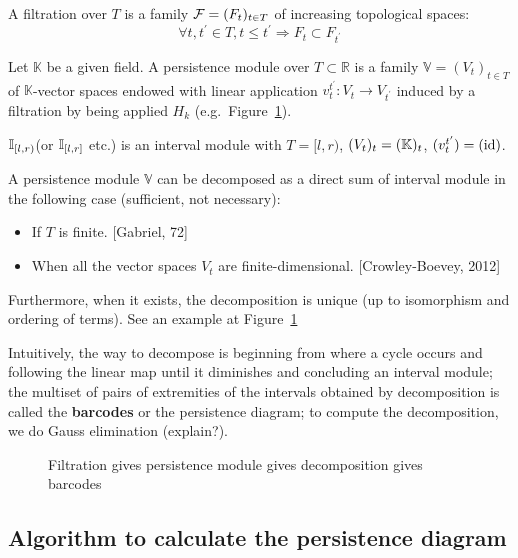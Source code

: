 \begin{definition}[Filtration]
  A filtration over $T$ is a family $\mathcal{F} = (F_t)_{t\in T}$ of increasing topological spaces:
  $$
  \forall t, t^{\prime} \in T, t \leqslant t^{\prime} \Rightarrow F_t \subset F_{t^{\prime}}
  $$
\end{definition}

\begin{definition}
  Let $\mathbb{K}$ be a given field. A persistence module over $T \subset \mathbb{R}$ is a family $\mathbb{V}=\left(V_t\right)_{t \in T}$ of $\mathbb{K}$-vector spaces
  endowed with linear application $v_t^{t^{\prime}}: V_t \rightarrow V_{t^{\prime}}$ induced by
  a filtration by being applied $H_k$ (e.g.\ Figure~\ref{fig:tda_diagram}).

  $\mathbb{I}_{[l, r)}$(or $\mathbb{I}_{[l, r]}$ etc.) is an interval module with $T = [l, r)$,
  $(V_t)_t = (\mathbb{K})_t$, $(v^{t'}_t) = (\operatorname{id})$.
\end{definition}

\begin{theorem}
  A persistence module $\mathbb{V}$ can be decomposed as a direct sum of interval module
  in the following case (sufficient, not necessary):
  \begin{itemize}
    \item If $T$ is finite. [Gabriel, 72]
    \item When all the vector spaces $V_t$ are finite-dimensional. [Crowley-Boevey, 2012]
  \end{itemize}
  Furthermore, when it exists, the decomposition is unique (up to isomorphism and ordering of terms).
  See an example at Figure~\ref{fig:tda_diagram}
\end{theorem}

\RM Intuitively, the way to decompose is beginning from where a cycle occurs
and following the linear map until it diminishes and concluding an interval module;
the multiset of pairs of extremities of the intervals obtained by decomposition is called the \textbf{barcodes}
or the persistence diagram; to compute the decomposition, we do Gauss elimination (explain?).

\begin{figure}[htbp]
\centering

\caption{Filtration gives persistence module gives decomposition gives barcodes}
\label{fig:tda_diagram}
\end{figure}

\subsection{Algorithm to calculate the persistence diagram}

